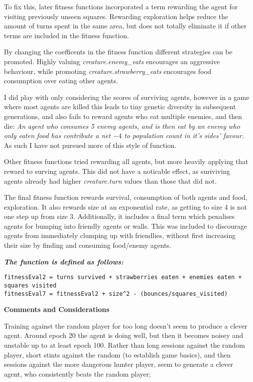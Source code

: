 \documentclass[
]{article}
\begin{document}
To fix this, later fitness functions incorporated a term rewarding the
agent for visiting previously unseen squares. Rewarding exploration
helps reduce the amount of turns spent in the same area, but does not
totally eliminate it if other terms are included in the fitness
function.

By changing the coefficents in the fitness function different strategies
can be promoted. Highly valuing \emph{creature.enemy\_eats} encourages
an aggressive behaviour, while promoting
\emph{creature.strawberry\_eats} encourages food consumption over eating
other agents.

I did play with only considering the scores of surviving agents, however
in a game where most agents are killed this leads to tiny genetic
diversity in subsequent generations, and also fails to reward agents who
eat multiple enemies, and then die: \emph{An agent who consumes 5 enemy
agents, and is then eat by an enemy who only eaten food has contribute a
net \(-4\) to population count in it's sides' favour.} As such I have
not pursued more of this style of function.

Other fitness functions tried rewarding all agents, but more heavily
applying that reward to surving agents. This did not have a noticable
effect, as suriviving agents already had higher \emph{creature.turn}
values than those that did not.

The final fitness function rewards survival, consumption of both agents
and food, exploration. It also rewards size at an exponential rate, as
getting to size 4 is not one step up from size 3. Additionally, it
includes a final term which penalises agents for bumping into friendly
agents or walls. This was included to discourage agents from immediately
clumping up with friendlies, without first increasing their size by
finding and consuming food/enemy agents.

\textbf{\emph{The function is defined as follows:}}

\begin{verbatim}
fitnessEval2 = turns survived + strawberries eaten + enemies eaten + squares visited
fitnessEval7 = fitnessEval2 + size^2 - (bounces/squares_visited)
\end{verbatim}

\textbf{Comments and Considerations}

Training against the random player for too long doesn't seem to produce
a clever agent. Around epoch 20 the agent is doing well, but then it
becomes noisey and unstable up to at least epoch 100. Rather than long
sessions against the random player, short stints against the random (to
establish game basics), and then sessions against the more dangerous
hunter player, seem to generate a clever agent, who consistently beats
the random player;
\end{document}
